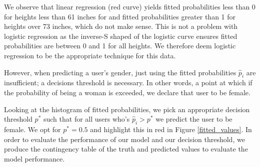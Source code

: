 \documentclass{article}\usepackage[]{graphicx}\usepackage[]{color}
\begin{document}
We observe that linear regression (red curve) yields fitted probabilities less than 0 for heights less than 61 inches for and fitted probabilities greater than 1 for heights over 73 inches, which do not make sense.  This is not a problem with logistic regression as the inverse-S shaped of the logistic curve ensures fitted probabilities are between 0 and 1 for all heights.   We therefore deem logistic regression to be the appropriate technique for this data.

However, when predicting a user's gender, just using the fitted probabilities $\widehat{p}_i$ are insufficient; a decisions threshold is necessary.  In other words, a point at which if the probability of being a woman is exceeded, we declare that user to be female.  

Looking at the histogram of fitted probabilities, we pick an appropriate decision threshold $p^*$ such that for all users who's $\widehat{p}_i > p^*$ we predict the user to be female.  We opt for $p^* = 0.5$ and highlight this in red in Figure \ref{fitted_values}.  In order to evaluate the performance of our model and our decision threshold, we produce the contingency table of the truth and predicted values to evaluate the model performance.  
\end{document}
